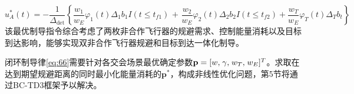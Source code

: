 \begin{equation}
\label{eq:66}
u_A^*(t) =  - \frac{1}{{{\Delta _{{\text{det}}}}}}\left\{ {\frac{{{w_1}}}{{{w_E}}}{\varphi _1}(t){\Delta _1}{b_1}I(t \leqslant {t_{f1}})} \right.{\text{ + }}\left. {\frac{{{w_2}}}{{{w_E}}}{\varphi _2}(t){\Delta _2}{b_2}I(t \leqslant {t_{f2}}) + \frac{{{w_T}}}{{{w_E}}}{\varphi _T}(t){\Delta _T}{b_t}} \right\}
\end{equation}
该最优制导指令综合考虑了两枚非合作飞行器的规避需求、控制能量消耗以及目标到达影响，能够实现双非合作飞行器规避和目标到达一体化制导。

\begin{problem}[制导参数优化]
闭环制导律\eqref{eq:66}需要针对各交会场景最优确定参数${\mathbf{p}} = {[w,{\kern 1pt} \gamma ,{\kern 1pt} {w_T},{\kern 1pt} {w_E}]^T}$。求取在达到期望规避距离的同时最小化能量消耗的${{\mathbf{p}}^*}$，构成非线性优化问题，第5节将通过BC-TD3框架予以解决。
\end{problem}
